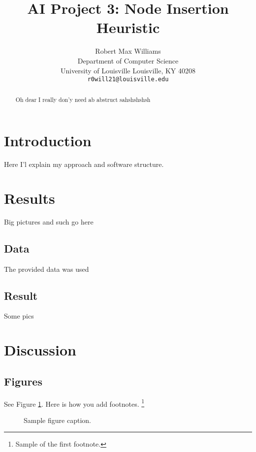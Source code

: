 \documentclass{article}
\title{AI Project 3: Node Insertion Heuristic}
\author{
  Robert Max Williams\\
  Department of Computer Science\\
  University of Louisville
  Louisville, KY 40208 \\
  \texttt{r0will21@louisville.edu} \\
}
\begin{document}
\maketitle

\begin{abstract}
Oh dear I really don'y need ab abstruct sahshshshsh
\end{abstract}




\section{Introduction}
Here I'l explain my approach and software structure.
\lipsum[2]



\section{Results}

Big pictures and such go here

\subsection{Data}
The provided data was used 

\subsection{Result}
Some pics
\lipsum[4] 



\section{Discussion}



\subsection{Figures}
\lipsum[10] 
See Figure \ref{fig:fig1}. Here is how you add footnotes. \footnote{Sample of the first footnote.}
\lipsum[11] 

\begin{figure}
  \centering
  \fbox{\rule[-.5cm]{4cm}{4cm} \rule[-.5cm]{4cm}{0cm}}
  \caption{Sample figure caption.}
  \label{fig:fig1}
\end{figure}
\end{document}

